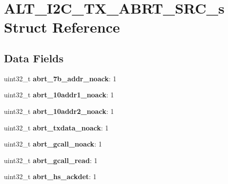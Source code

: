\hypertarget{structALT__I2C__TX__ABRT__SRC__s}{}\section{A\+L\+T\+\_\+\+I2\+C\+\_\+\+T\+X\+\_\+\+A\+B\+R\+T\+\_\+\+S\+R\+C\+\_\+s Struct Reference}
\label{structALT__I2C__TX__ABRT__SRC__s}
\subsection*{Data Fields}
\begin{DoxyCompactItemize}
\item 
\mbox{\label{structALT__I2C__TX__ABRT__SRC__s_ae3f65160337f80696b8890b34dfd1593}} 
uint32\+\_\+t {\bfseries abrt\+\_\+7b\+\_\+addr\+\_\+noack}\+: 1
\item 
\mbox{\label{structALT__I2C__TX__ABRT__SRC__s_a2f4a0b6a4d07c0c4fed66577d3adfa4a}} 
uint32\+\_\+t {\bfseries abrt\+\_\+10addr1\+\_\+noack}\+: 1
\item 
\mbox{\label{structALT__I2C__TX__ABRT__SRC__s_a26210a7bca2bfe67dd61ab976f00f654}} 
uint32\+\_\+t {\bfseries abrt\+\_\+10addr2\+\_\+noack}\+: 1
\item 
\mbox{\label{structALT__I2C__TX__ABRT__SRC__s_a48ad099c06d6fbe6fa0d2e413fdc6282}} 
uint32\+\_\+t {\bfseries abrt\+\_\+txdata\+\_\+noack}\+: 1
\item 
\mbox{\label{structALT__I2C__TX__ABRT__SRC__s_a24c86b08ace0b83f4fa2e23fa7e5e485}} 
uint32\+\_\+t {\bfseries abrt\+\_\+gcall\+\_\+noack}\+: 1
\item 
\mbox{\label{structALT__I2C__TX__ABRT__SRC__s_a822c99fda80f3f32c099afe0c786914d}} 
uint32\+\_\+t {\bfseries abrt\+\_\+gcall\+\_\+read}\+: 1
\item 
\mbox{\label{structALT__I2C__TX__ABRT__SRC__s_a5ddc458609261693fab0109a711fc7c0}} 
uint32\+\_\+t {\bfseries abrt\+\_\+hs\+\_\+ackdet}\+: 1
\item 
\mbox{\label{structALT__I2C__TX__ABRT__SRC__s_ad502f690f475a1b7e687ee31a4e53163}} 

\end{DoxyCompactItemize}
